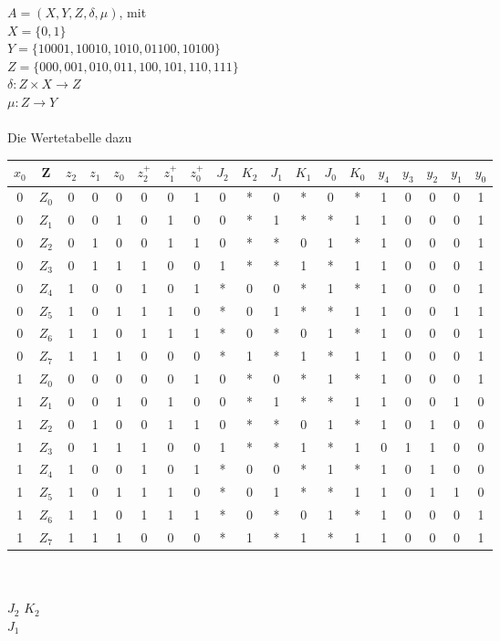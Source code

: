 \documentclass[11pt,a4paper]{article}
\begin{document}
$A=(X,Y,Z, \delta, \mu )$, mit\\
$X=\lbrace 0,1 \rbrace$\\
$Y= \lbrace 10001,10010,1010,01100,10100 \rbrace$\\
$Z=\lbrace 000,001,010,011,100,101,110,111 \rbrace$ \\
$\delta : Z \times X \rightarrow Z$\\
$\mu : Z \rightarrow Y$\\ \\
Die Wertetabelle dazu\\
\begin{tabular}{c | c | c | c | c | | c | c | c | | c | c | c | c | c | c | | c | c | c | c | c}
$x_0$&Z&$z_2$&$z_1$&$z_0$&$z^+_2$&$z^+_1$&$z^+_0$&$J_2$&$K_2$&$J_1$&$K_1$&$J_0$&$K_0$&$y_4$&$y_3$&$y_2$&$y_1$&$y_0$ \\ \hline
0&$Z_0$&0&0&0&0&0&1&0&*&0&*&0&*&1&0&0&0&1\\
0&$Z_1$&0&0&1&0&1&0&0&*&1&*&*&1&1&0&0&0&1\\
0&$Z_2$&0&1&0&0&1&1&0&*&*&0&1&*&1&0&0&0&1\\
0&$Z_3$&0&1&1&1&0&0&1&*&*&1&*&1&1&0&0&0&1\\
0&$Z_4$&1&0&0&1&0&1&*&0&0&*&1&*&1&0&0&0&1\\
0&$Z_5$&1&0&1&1&1&0&*&0&1&*&*&1&1&0&0&1&1\\
0&$Z_6$&1&1&0&1&1&1&*&0&*&0&1&*&1&0&0&0&1\\
0&$Z_7$&1&1&1&0&0&0&*&1&*&1&*&1&1&0&0&0&1\\ \hline
1&$Z_0$&0&0&0&0&0&1&0&*&0&*&1&*&1&0&0&0&1\\
1&$Z_1$&0&0&1&0&1&0&0&*&1&*&*&1&1&0&0&1&0\\
1&$Z_2$&0&1&0&0&1&1&0&*&*&0&1&*&1&0&1&0&0\\
1&$Z_3$&0&1&1&1&0&0&1&*&*&1&*&1&0&1&1&0&0\\
1&$Z_4$&1&0&0&1&0&1&*&0&0&*&1&*&1&0&1&0&0\\
1&$Z_5$&1&0&1&1&1&0&*&0&1&*&*&1&1&0&1&1&0\\
1&$Z_6$&1&1&0&1&1&1&*&0&*&0&1&*&1&0&0&0&1\\
1&$Z_7$&1&1&1&0&0&0&*&1&*&1&*&1&1&0&0&0&1\\
\end{tabular}\\ \\
$J_2$ 
 $K_2$
\\
$J_1$
\end{document}
